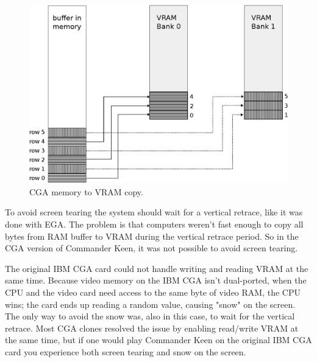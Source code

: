 \documentclass[book.tex]{subfiles}
\begin{document}
\begin{figure}[H]
\centering
\includegraphics[width=1.0\textwidth]{imgs/drawings/cga_VRAM_copy.eps}
\caption{CGA memory to VRAM copy.}
\label{fig:cga_interlaced}
\end{figure}

\par
To avoid screen tearing the system should wait for a vertical retrace, like it was done with EGA. The problem is that computers weren't fast enough to copy all bytes from RAM buffer to VRAM during the vertical retrace period. So in the CGA version of Commander Keen, it was not possible to avoid screen tearing.\\

\par
\begin{minipage}{\textwidth}
  
\end{minipage}
\label{cga_screen_refresh}
\par

\par
The original IBM CGA card could not handle writing and reading VRAM at the same time. Because video memory on the IBM CGA isn't dual-ported, when the CPU and the video card need access to the same byte of video RAM, the CPU wins; the card ends up reading a random value, causing "snow" on the screen. The only way to avoid the snow was, also in this case, to wait for the vertical retrace. Most CGA clones resolved the issue by enabling read/write VRAM at the same time, but if one would play Commander Keen on the original IBM CGA card you experience both screen tearing and snow on the screen.\\
\par
\end{document}
